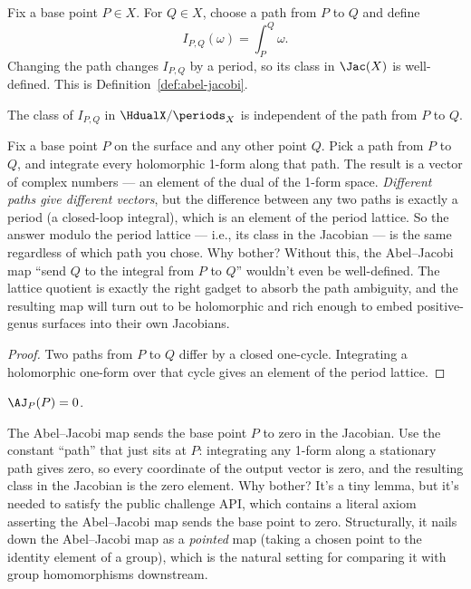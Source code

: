 Fix a base point \(P\in X\). For \(Q\in X\), choose a path from \(P\) to \(Q\)
and define
\[
  I_{P,Q}(\omega)=\int_P^Q\omega.
\]
Changing the path changes \(I_{P,Q}\) by a period, so its class in
\(\Jac(X)\) is well-defined. This is Definition~\ref{def:abel-jacobi}.

\begin{lemma}
\label{lem:aj-path-independence}
The class of \(I_{P,Q}\) in \(\HdualX/\periods_X\) is independent of the path
from \(P\) to \(Q\).
\leanok
\end{lemma}

\begin{layman}
Fix a base point \(P\) on the surface and any other point \(Q\). Pick a
path from \(P\) to \(Q\), and integrate every holomorphic 1-form along
that path. The result is a vector of complex numbers --- an element of
the dual of the 1-form space. \emph{Different paths give different
vectors}, but the difference between any two paths is exactly a
period (a closed-loop integral), which is an element of the period
lattice. So the answer modulo the period lattice --- i.e., its class in
the Jacobian --- is the same regardless of which path you chose. Why
bother? Without this, the Abel--Jacobi map ``send \(Q\) to the integral
from \(P\) to \(Q\)'' wouldn't even be well-defined. The lattice
quotient is exactly the right gadget to absorb the path ambiguity, and
the resulting map will turn out to be holomorphic and rich enough to
embed positive-genus surfaces into their own Jacobians.
\end{layman}

\begin{proof}
\leanok
Two paths from \(P\) to \(Q\) differ by a closed one-cycle. Integrating a
holomorphic one-form over that cycle gives an element of the period lattice.
\end{proof}

\begin{lemma}
\label{lem:aj-self}
\(\AJ_P(P)=0\).
\leanok
\end{lemma}

\begin{layman}
The Abel--Jacobi map sends the base point \(P\) to zero in the Jacobian.
Use the constant ``path'' that just sits at \(P\): integrating any
1-form along a stationary path gives zero, so every coordinate of the
output vector is zero, and the resulting class in the Jacobian is the
zero element. Why bother? It's a tiny lemma, but it's needed to satisfy
the public challenge API, which contains a literal axiom asserting the
Abel--Jacobi map sends the base point to zero. Structurally, it nails
down the Abel--Jacobi map as a \emph{pointed} map (taking a chosen
point to the identity element of a group), which is the natural setting
for comparing it with group homomorphisms downstream.
\end{layman}

